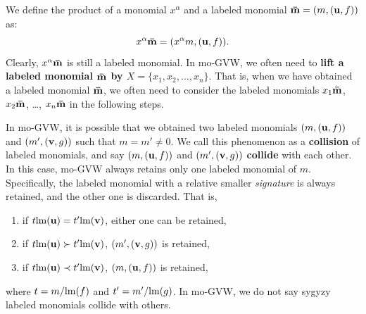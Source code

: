 \documentclass[final, number, 3p,12pt]{elsarticle}
\def\brm{{\bf \bar{m}}}
\def\lm{{\rm lm}} %
\def\u{{\bf u}}
\def\v{{\bf v}}
\begin{document}


We define the product of a monomial $x^\alpha$  and a labeled monomial $\brm = (m, (\u, f))$ as: $$x^\alpha \brm = (x^\alpha m, (\u, f)).$$ Clearly, $x^\alpha \brm$ is still a labeled monomial. In mo-GVW, we often need to {\bf lift a labeled monomial $\brm$ by $X = \{x_1, x_2, \ldots, x_n\}$}. That is, when we have obtained a labeled monomial $\brm$, we often need to consider the labeled monomials $x_1\brm$, $x_2\brm$, \ldots, $x_n\brm$ in the following steps. 


In mo-GVW, it is possible that we obtained two labeled monomials $(m, (\u, f))$ and $(m', (\v, g))$ such that $m = m'\not=0$. We call this phenomenon as a {\bf collision} of labeled monomials, and say $(m, (\u, f))$ and $(m', (\v, g))$ {\bf collide} with each other. In this case, mo-GVW always retains only one labeled monomial of $m$. Specifically, the labeled monomial with a relative smaller {\em signature} is always retained, and the other one is discarded. That is, 

\begin{enumerate}

\item if $t\lm(\u) = t'\lm(\v)$, either one can be retained,

\item if $t\lm(\u) \succ t'\lm(\v)$, $(m', (\v, g))$ is retained,

\item if $t\lm(\u) \prec t'\lm(\v)$, $(m, (\u, f))$ is retained,

\end{enumerate}
where $t = m/\lm(f)$ and $t' = m'/\lm(g)$. In mo-GVW, we do not say sygyzy labeled monomials collide with others.



\end{document}
